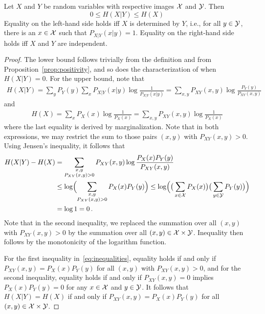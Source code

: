 \begin{proposition}\label{prop:conditional-bounds}
Let $X$ and $Y$ be random variables with respective images ${\cal X}$ and $\cal Y$. Then
\[
0 \leq H(X|Y) \leq H(X)
\]
Equality on the left-hand side holds iff $X$ is determined by $Y$,
i.e., for all $y\in {\cal Y}$, there is an $x\in {\cal X}$ such that
$P_{X|Y}(x|y)=1$.
Equality on the right-hand side holds iff
$X$ and $Y$ are independent.
\end{proposition}
%
\begin{proof}
The lower bound follows trivially from the definition and from Proposition~\ref{prop:positivity}, and so does the characterization of when $H(X|Y) = 0$. For the upper bound, note that
\begin{align}
H(X|Y) = \sum_{y} P_Y(y) \sum_x P_{X|Y}(x|y) \log\frac{1}{P_{X|Y}(x|y)} = \sum_{x,y} P_{XY}(x,y) \log\frac{P_Y(y)}{P_{XY}(x,y)}
\end{align}
and
\begin{align}
H(X) = \sum_x P_{X}(x) \log\frac{1}{P_{X}(x)} = \sum_{x,y} P_{XY}(x,y) \log\frac{1}{P_{X}(x)}
\end{align}
where the last equality is derived by marginalization. Note that in both expressions, we may restrict the sum to those pairs $(x,y)$ with $P_{XY}(x,y) > 0$. 
Using Jensen's inequality, it follows that
\begin{align}
H(X|Y) - H(X) &= \sum_{\substack{x,y\\P_{XY}(x,y)>0}} P_{XY}(x,y)\log
\frac{P_X(x)P_Y(y)}{P_{XY}(x,y)} \nonumber \\
&\leq \log\Bigl( \sum_{\substack{x,y\\P_{XY}(x,y)>0}} P_X(x)P_Y(y) \Bigr) \leq \log\Bigl(\big(\sum_{x \in \mathcal{X}}P_X(x)\big)\big(\sum_{y \in \mathcal{Y}}P_Y(y)\big)\Bigr) \label{eq:inequalities}\\
&= \log 1 = 0 \, . \nonumber
\end{align}
Note that in the second inequality, we replaced the summation over all $(x,y)$ with $P_{XY}(x,y) > 0$ by the summation over all $(x,y) \in {\cal X} \times {\cal Y}$. Inequality then follows by the monotonicity of the logarithm function.

For the first inequality in~\eqref{eq:inequalities}, equality holds if and only if $P_{XY}(x,y) = P_X(x) P_Y(y)$ for all $(x,y)$ with $P_{XY}(x,y) > 0$, and for the second inequality, equality holds if and only if $P_{XY}(x,y) = 0$ implies $P_X(x) P_Y(y) = 0$ for any $x \in \cal X$ and $y \in \cal Y$. It follows that $H(X|Y) = H(X)$ if and only if $P_{XY}(x,y) = P_X(x) P_Y(y)$ for all $(x,y) \in {\cal X} \times {\cal Y}$. 
\end{proof}



